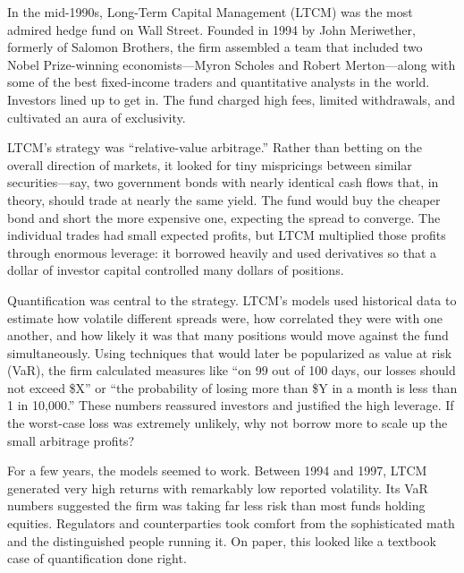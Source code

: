 \documentclass[11pt,openany]{book}
\begin{document}
\begin{corporateexample}

In the mid-1990s, Long-Term Capital Management (LTCM) was the most admired
hedge fund on Wall Street. Founded in 1994 by John Meriwether, formerly of
Salomon Brothers, the firm assembled a team that included two Nobel
Prize-winning economists---Myron Scholes and Robert Merton---along with some
of the best fixed-income traders and quantitative analysts in the world.
Investors lined up to get in. The fund charged high fees, limited withdrawals,
and cultivated an aura of exclusivity.

LTCM's strategy was ``relative-value arbitrage.'' Rather than betting on the
overall direction of markets, it looked for tiny mispricings between similar
securities---say, two government bonds with nearly identical cash flows that,
in theory, should trade at nearly the same yield. The fund would buy the
cheaper bond and short the more expensive one, expecting the spread to
converge. The individual trades had small expected profits, but LTCM multiplied
those profits through enormous leverage: it borrowed heavily and used
derivatives so that a dollar of investor capital controlled many dollars of
positions.

Quantification was central to the strategy. LTCM's models used historical data
to estimate how volatile different spreads were, how correlated they were with
one another, and how likely it was that many positions would move against the
fund simultaneously. Using techniques that would later be popularized as value
at risk (VaR), the firm calculated measures like ``on 99 out of 100 days, our
losses should not exceed \$X'' or ``the probability of losing more than \$Y in
a month is less than 1 in 10,000.'' These numbers reassured investors and
justified the high leverage. If the worst-case loss was extremely unlikely, why
not borrow more to scale up the small arbitrage profits?

For a few years, the models seemed to work. Between 1994 and 1997, LTCM
generated very high returns with remarkably low reported volatility. Its VaR
numbers suggested the firm was taking far less risk than most funds holding
equities. Regulators and counterparties took comfort from the sophisticated
math and the distinguished people running it. On paper, this looked like a
textbook case of quantification done right.


\end{corporateexample}
\end{document}
